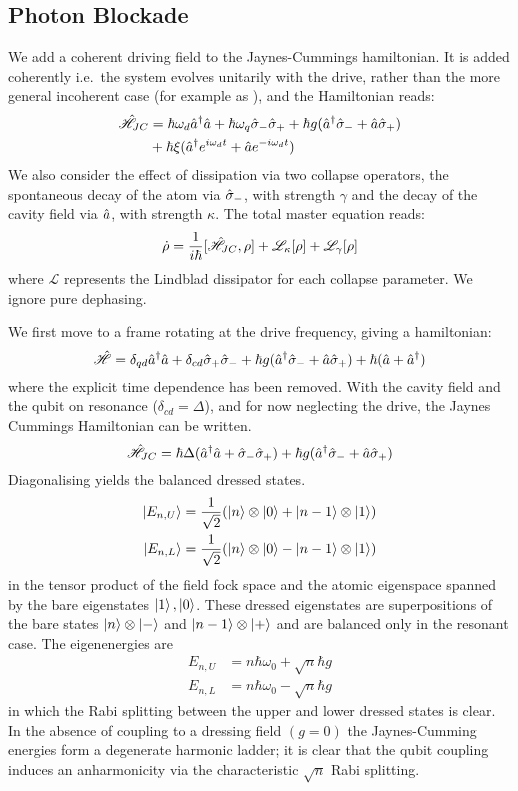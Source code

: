 \subsection{Photon Blockade}
We add a coherent driving field to the Jaynes-Cummings hamiltonian. It is added coherently i.e.\ the system evolves unitarily with the drive, rather than the more general incoherent case (for example as \cite{Xu2014}), and the Hamiltonian reads:
\begin{align}
    \hat{\mathscr{H}}_{JC} &= \hbar \omega_d {\hat{a}^\dagger} \hat{a} + \hbar \omega_q \hat{\sigma}_- \hat{\sigma}_+ +\hbar g ({\hat{a}^\dagger} \hat{\sigma}_-+ \hat{a} \hat{\sigma}_+)\\
    & + \hbar \xi ({\hat{a}^\dagger} e^{i\omega_d t} + \hat{a} e^{-i\omega_d t})
\end{align}
We also consider the effect of dissipation via two collapse operators, the spontaneous decay of the atom via $\hat{\sigma}_-$, with strength $\gamma$ and the decay of the cavity field via $\hat{a}$, with strength $\kappa$. The total master equation reads:
\begin{equation}
  \dot{\rho} = \frac{1}{i\hbar}[\hat{\mathscr{H}}_{JC}, \rho] + \mathscr{L}_\kappa[\rho] + \mathscr{L}_\gamma[\rho]
\end{equation}
where $\mathscr{L}$ represents the Lindblad dissipator for each collapse parameter. 
We ignore pure dephasing.

We first move to a frame rotating at the drive frequency, giving a hamiltonian:
\begin{equation}
  \hat{\mathscr{H}} = \delta_{qd} {\hat{a}^\dagger} \hat{a} + \delta_{cd} \hat{\sigma}_+ \hat{\sigma}_- + \hbar g ({\hat{a}^\dagger} \hat{\sigma}_- + \hat{a} \hat{\sigma}_+) + \hbar (\hat{a} + {\hat{a}^\dagger})
\end{equation}
where the explicit time dependence has been removed.
With the cavity field and the qubit on resonance ($\delta_{cd} = \Delta$), and for now neglecting the drive, the Jaynes Cummings Hamiltonian can be written.
\begin{equation}
  \hat{\mathscr{H}}_{JC} = \hbar \Delta ({\hat{a}^\dagger} \hat{a} + \hat{\sigma}_- \hat{\sigma}_+) +\hbar g ({\hat{a}^\dagger} \hat{\sigma}_- + \hat{a} \hat{\sigma}_+)
\end{equation}
Diagonalising yields the balanced dressed states.
\begin{align}
  \ket{E_{n, U}} & = \frac{1}{\sqrt{2}} (\ket{n} \otimes\ket{0}+\ket{n-1} \otimes\ket{1}) \\
  \ket{E_{n, L}} & = \frac{1}{\sqrt{2}} (\ket{n} \otimes\ket{0}-\ket{n-1} \otimes\ket{1})
\end{align}
in the tensor product of the field fock space and the atomic eigenspace spanned by the bare eigenstates $\ket{1}, \ket{0}$. These dressed eigenstates are superpositions of the bare states $\ket{n} \otimes\ket{-}$ and $\ket{n-1} \otimes\ket{+}$ and are balanced only in the resonant case. The eigenenergies are
\begin{align}
  E_{n, U} &= n \hbar \omega_0 + \sqrt{n} \hbar g \\
  E_{n, L} &= n \hbar \omega_0 - \sqrt{n} \hbar g
\end{align}
in which the Rabi splitting between the upper and lower dressed states is clear. In the absence of coupling to a dressing field $(g=0)$ the Jaynes-Cumming energies form a degenerate harmonic ladder; it is clear that the qubit coupling induces an anharmonicity via the characteristic $\sqrt{n}$ Rabi splitting.

